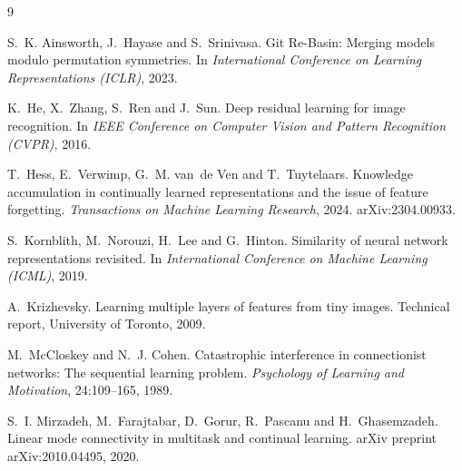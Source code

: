 \documentclass[11pt,a4paper]{article}
\begin{document}
\begin{thebibliography}{9}\small

S.~K. Ainsworth, J.~Hayase and S.~Srinivasa.
\newblock Git Re-Basin: Merging models modulo permutation symmetries.
\newblock In \emph{International Conference on Learning Representations (ICLR)}, 2023.

K.~He, X.~Zhang, S.~Ren and J.~Sun.
\newblock Deep residual learning for image recognition.
\newblock In \emph{IEEE Conference on Computer Vision and Pattern Recognition (CVPR)}, 2016.

T.~Hess, E.~Verwimp, G.~M. van~de Ven and T.~Tuytelaars.
\newblock Knowledge accumulation in continually learned representations and the issue of feature forgetting.
\newblock \emph{Transactions on Machine Learning Research}, 2024. arXiv:2304.00933.

S.~Kornblith, M.~Norouzi, H.~Lee and G.~Hinton.
\newblock Similarity of neural network representations revisited.
\newblock In \emph{International Conference on Machine Learning (ICML)}, 2019.

A.~Krizhevsky.
\newblock Learning multiple layers of features from tiny images.
\newblock Technical report, University of Toronto, 2009.

M.~McCloskey and N.~J. Cohen.
\newblock Catastrophic interference in connectionist networks: The sequential learning problem.
\newblock \emph{Psychology of Learning and Motivation}, 24:109--165, 1989.

S.~I. Mirzadeh, M.~Farajtabar, D.~Gorur, R.~Pascanu and H.~Ghasemzadeh.
\newblock Linear mode connectivity in multitask and continual learning.
\newblock arXiv preprint arXiv:2010.04495, 2020.

\end{thebibliography}
\end{document}
